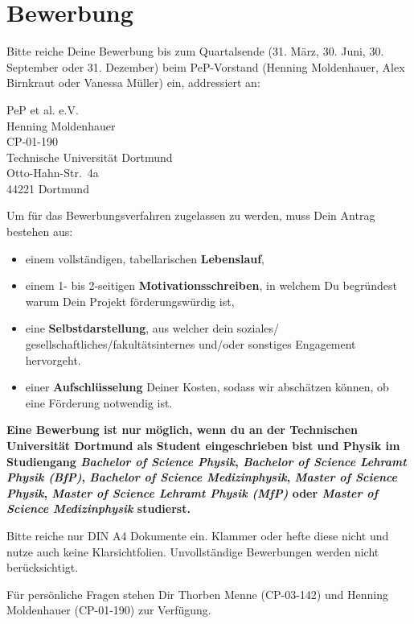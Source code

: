 \documentclass[
  paper=a4,
  fontsize=12pt,
  DIV=16,
  headheight=52pt,
  footheight=45pt,
  headinclude,
  parskip=full,
]{scrartcl}
\begin{document}
\section*{Bewerbung}

Bitte reiche Deine Bewerbung bis zum Quartalsende (31. März, 30. Juni,
30. September oder 31. Dezember) beim PeP-Vorstand
(Henning Moldenhauer, Alex Birnkraut oder Vanessa Müller) ein,
addressiert an:

PeP et al. e.V.\\
Henning Moldenhauer\\
CP-01-190\\[0.5\baselineskip]
Technische Universität Dortmund\\
Otto-Hahn-Str.~4a\\
44221 Dortmund

Um für das Bewerbungsverfahren zugelassen zu werden, muss Dein Antrag bestehen aus:
\begin{itemize}
  \item einem vollständigen, tabellarischen \textbf{Lebenslauf},
  \item einem 1- bis 2-seitigen \textbf{Motivationsschreiben}, in welchem Du
	  begründest warum Dein Projekt förderungswürdig ist,
  \item eine \textbf{Selbstdarstellung}, aus welcher dein soziales/
	  gesellschaftliches/fakultätsinternes und/oder sonstiges Engagement hervorgeht.
  \item einer \textbf{Aufschlüsselung} Deiner Kosten, sodass wir abschätzen können,
	  ob eine Förderung notwendig ist.
\end{itemize}

\textbf{%
  Eine Bewerbung ist nur möglich, wenn du an der Technischen Universität Dortmund
  als Student eingeschrieben bist und Physik im Studiengang
  \emph{Bachelor of Science Physik},
  \emph{Bachelor of Science Lehramt Physik (BfP)},
  \emph{Bachelor of Science Medizinphysik},
  \emph{Master of Science Physik},
  \emph{Master of Science Lehramt Physik (MfP)} oder
  \emph{Master of Science Medizinphysik} studierst.
}

Bitte reiche nur DIN A4 Dokumente ein. Klammer oder hefte diese nicht und nutze auch
keine Klarsichtfolien. Unvollständige Bewerbungen werden nicht berücksichtigt.

Für persönliche Fragen stehen Dir Thorben Menne (CP-03-142) und
Henning Moldenhauer (CP-01-190) zur Verfügung.
\end{document}
